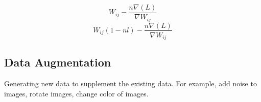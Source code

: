 	\begin{equation}
		W_{ij} - \frac{n\nabla\left(L\right)}{\nabla W_{ij}}
	\end{equation}
	\begin{equation}
		W_{ij}\left(1-nl\right) - \frac{n\nabla\left(L\right)}{\nabla W_{ij}}
	\end{equation}
	\begin{mathwhere}[0.75in]
	\end{mathwhere}

	\subsection{Data Augmentation}
Generating new data to supplement the existing data.  For example, add noise to images, rotate images, change color of images.

